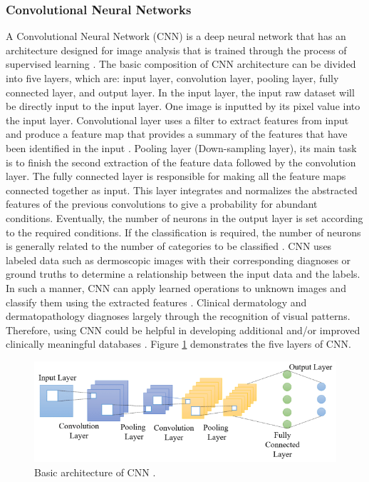 \documentclass[12pt]{diazessay}
\begin{document}
    \subsubsection{Convolutional Neural Networks} 
    \hspace{0.7cm} A Convolutional Neural Network (CNN) is a deep neural network that has an architecture designed for image analysis that is trained through the process of supervised learning \cite{Haggenmuller2021-hc}. The basic composition of CNN architecture can be divided into five layers, which are: input layer, convolution layer, pooling layer, fully connected layer, and output layer. In the input layer, the input raw dataset will be directly input to the input layer. One image is inputted by its pixel value into the input layer. Convolutional layer  uses a filter to extract features from input and produce a feature map that provides a summary of the features that have been identified in the input \cite{brownlee2019convolutional}. Pooling layer (Down-sampling layer), its main task is to finish the second extraction of the feature data followed by the convolution layer. The fully connected layer is responsible for making all the feature maps connected together as input. This layer integrates and normalizes the abstracted features of the previous convolutions to give a probability for abundant conditions. Eventually, the number of neurons in the output layer is set according to the required conditions. If the classification is required, the number of neurons is generally related to the number of categories to be classified \cite{Gu2019-zo}. CNN uses labeled data such as dermoscopic images with their corresponding diagnoses or ground truths to determine a relationship between the input data and the labels. In such a manner, CNN can apply learned operations to unknown images and classify them using the extracted features \cite{Haggenmuller2021-hc}. Clinical dermatology and dermatopathology diagnoses largely through the recognition of visual patterns. Therefore, using CNN could be helpful in developing additional and/or improved clinically meaningful databases \cite{Tschandl2019-iu}. Figure \ref{fig:Archi} demonstrates the five layers of CNN.
    \begin{figure}[H]
        \centering
        \includegraphics[width=12cm]{Figures/CNN-archi-mybackground.PNG}
        \caption[Basic architecture of CNN]{Basic architecture of CNN \cite{Gu2019-zo}.}
        \label{fig:Archi}
    \end{figure}
\end{document}
